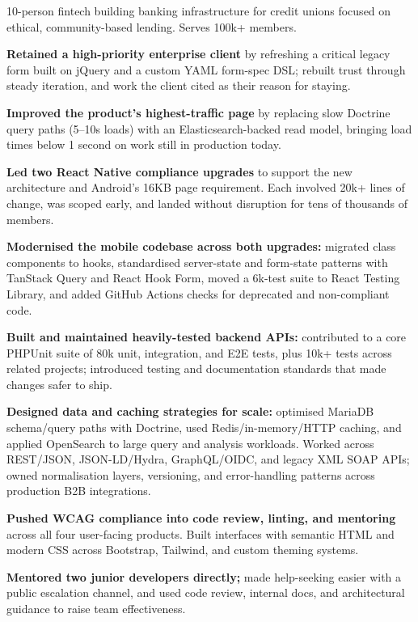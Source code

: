 

10-person fintech building banking infrastructure for credit unions focused on ethical, community-based lending. Serves \cvapprox{}100k+ members.

\begin{cvitems}
  \item \textbf{Retained a high-priority enterprise client} by refreshing a critical legacy form built on jQuery and a custom YAML form-spec DSL; rebuilt trust through steady iteration, and work the client cited as their reason for staying.
  \item \textbf{Improved the product's highest-traffic page} by replacing slow Doctrine query paths (5--10s loads) with an Elasticsearch-backed read model, bringing load times below 1 second on work still in production today.
  \item \textbf{Led two React Native compliance upgrades} to support the new architecture and Android's 16KB page requirement. Each involved 20k+ lines of change, was scoped early, and landed without disruption for tens of thousands of members.
  \item \textbf{Modernised the mobile codebase across both upgrades:} migrated class components to hooks, standardised server-state and form-state patterns with TanStack Query and React Hook Form, moved a \cvapprox{}6k-test suite to React Testing Library, and added GitHub Actions checks for deprecated and non-compliant code.
  \item \textbf{Built and maintained heavily-tested backend APIs:} contributed to a core PHPUnit suite of \cvapprox{}80k unit, integration, and E2E tests, plus 10k+ tests across related projects; introduced testing and documentation standards that made changes safer to ship.
  \item \textbf{Designed data and caching strategies for scale:} optimised MariaDB schema/query paths with Doctrine, used Redis/in-memory/HTTP caching, and applied OpenSearch to large query and analysis workloads. Worked across REST/JSON, JSON-LD/Hydra, GraphQL/OIDC, and legacy XML SOAP APIs; owned normalisation layers, versioning, and error-handling patterns across production B2B integrations.
  \item \textbf{Pushed WCAG compliance into code review, linting, and mentoring} across all four user-facing products. Built interfaces with semantic HTML and modern CSS across Bootstrap, Tailwind, and custom theming systems.
  \item \textbf{Mentored two junior developers directly;} made help-seeking easier with a public escalation channel, and used code review, internal docs, and architectural guidance to raise team effectiveness.
\end{cvitems}
